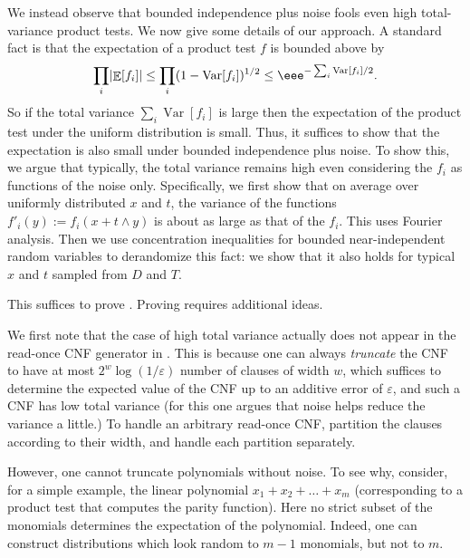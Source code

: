 \documentclass{toc}
\def\eps{\varepsilon}
\DeclarePairedDelimiter{\abs}{\lvert}{\rvert}
\DeclareMathOperator*{\E}{\mathbb{E}}                 %
\DeclareMathOperator*{\Var}{Var}                 %
\begin{document}
We instead observe that bounded independence plus noise fools even
high total-variance product tests.
We now give some details of our approach.
A standard fact is that the expectation of a product test $f$ is bounded above by
\[
  \prod_i \abs{\E[f_i]}
  \le \prod_i (1 - \Var[f_i])^{1/2}
  \le \eee^{-\sum_i \Var[f_i]/2} .
\]
So if the total variance $\sum_i \Var[f_i]$ is large then the expectation of the product test under the uniform distribution is small.
Thus, it suffices to show that the expectation is also
small under bounded independence plus noise.  To show this, we argue
that typically, the total variance remains high even considering the $f_i$ as
functions of the noise only.  Specifically, we first show that on average
over uniformly distributed $x$ and $t$, the variance of the functions $f'_i(y) := f_i(x + t
\wedge y)$ is about as large as that of the $f_i$.  This uses Fourier
analysis. Then we use concentration inequalities for bounded near-independent random variables to derandomize this fact: we show that it also holds for typical $x$ and $t$ sampled from $D$ and $T$.

This suffices to prove .
Proving  requires additional ideas.

We first note that the case of high total variance actually does not appear in the
read-once CNF generator in \cite{GopalanMRTV12}.
This is because one can always \emph{truncate} the CNF to have at most $2^w \log(1/\eps)$
number of clauses of width $w$, which suffices to
determine the expected value of the CNF up to an additive error of $\eps$,
and such a CNF has low total variance (for this one argues that noise
helps reduce the variance a little.) To handle an arbitrary read-once
CNF, \cite{GopalanMRTV12} partition the clauses according to their width,
and handle each partition separately.

However, one cannot truncate polynomials without noise.
To see why, consider, for a simple example, the linear polynomial $	x_1 + x_2 + \ldots + x_m$ (corresponding to a product test that computes the parity function).
Here no strict subset of the monomials determines the expectation of the polynomial.
Indeed, one can construct distributions which look random to $m-1$ monomials, but not to $m$.
\end{document}
